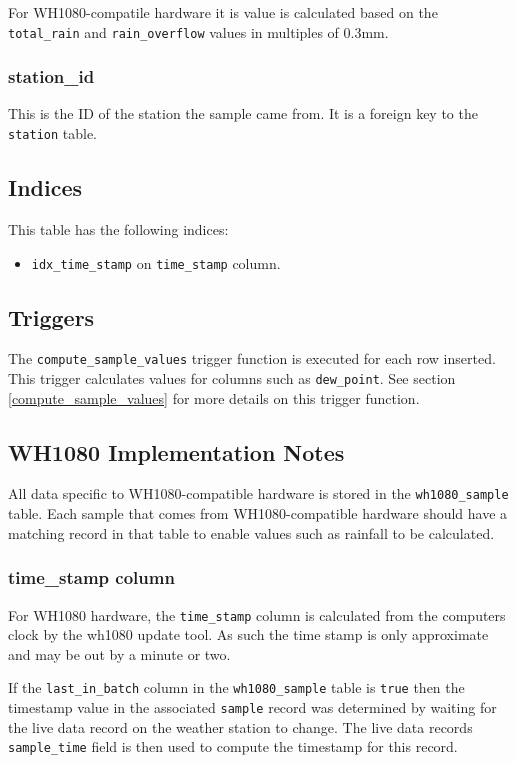 \documentclass[a4paper,10pt]{book}
\begin{document}
For WH1080-compatile hardware it is value is calculated based on the \verb|total_rain| and \verb|rain_overflow| values in multiples of 0.3mm.

\subsubsection{station\_id}
This is the ID of the station the sample came from. It is a foreign key to the \verb|station| table.

\subsection{Indices}
This table has the following indices:
\begin{itemize}
\item \verb|idx_time_stamp| on \verb|time_stamp| column.
\end{itemize}

\subsection{Triggers}
The \verb|compute_sample_values| trigger function is executed for each row inserted. This trigger calculates values for columns such as \verb|dew_point|. See section \ref{compute_sample_values} for more details on this trigger function.

\subsection{WH1080 Implementation Notes}
All data specific to WH1080-compatible hardware is stored in the \verb|wh1080_sample| table. Each sample that comes from WH1080-compatible hardware should have a matching record in that table to enable values such as rainfall to be calculated.

\subsubsection{time\_stamp column}
For WH1080 hardware, the \verb|time_stamp| column is calculated from the computers clock by the wh1080 update tool. As such the time stamp is only approximate and may be out by a minute or two.

If the \verb|last_in_batch| column in the \verb|wh1080_sample| table is \verb|true| then the timestamp value in the associated \verb|sample| record was determined by waiting for the live data record on the weather station to change. The live data records \verb|sample_time| field is then used to compute the timestamp for this record.
\end{document}
